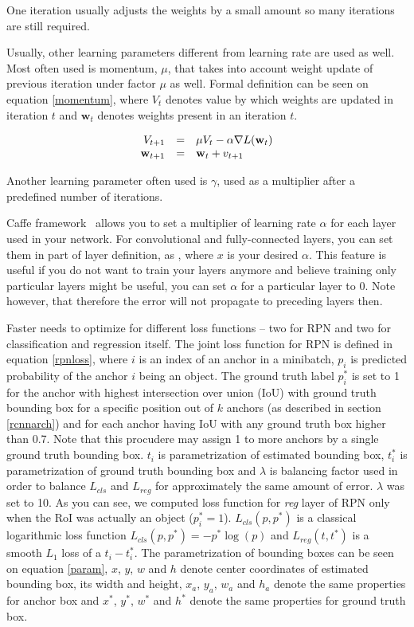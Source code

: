 One iteration usually adjusts the weights by a small amount so many iterations are still required.

Usually, other learning parameters different from learning rate are used as well. Most often used is momentum, $\mu$, that takes into account weight update of previous iteration under factor $\mu$ as well. Formal definition can be seen on equation \ref{momentum}, where $V_t$ denotes value by which weights are updated in iteration $t$ and $\textbf{w}_t$ denotes weights present in an iteration $t$.

\begin{equation}
\begin{array}{r c l}
V_{t+1}&=&\mu V_t - \alpha \nabla L(\textbf{w}_t)\\
\textbf{w}_{t+1}&=&\textbf{w}_t + v_{t+1}
\end{array}
\label{momentum}
\end{equation}

Another learning parameter often used is $\gamma$, used as a multiplier after a predefined number of iterations.

Caffe framework~\cite{caffe} allows you to set a multiplier of learning rate $\alpha$ for each layer used in your network. For convolutional and fully-connected layers, you can set them in  part of layer definition, as , where $x$ is your desired $\alpha$. This feature is useful if you do not want to train your layers anymore and believe training only particular layers might be useful, you can set $\alpha$ for a particular layer to 0. Note however, that therefore the error will not propagate to preceding layers then.

Faster \rcnn{} needs to optimize for different loss functions -- two for RPN and two for classification and regression itself. The joint loss function for RPN is defined in equation \ref{rpnloss}, where $i$ is an index of an anchor in a minibatch, $p_i$ is predicted probability of the anchor $i$ being an object. The ground truth label $p^*_i$ is set to 1 for the anchor with highest intersection over union (IoU) with ground truth bounding box for a specific position out of $k$ anchors (as described in section \ref{rcnnarch}) and for each anchor having IoU with any ground truth box higher than 0.7. Note that this procudere may assign 1 to more anchors by a single ground truth bounding box. $t_i$ is parametrization of estimated bounding box, $t_i^*$ is parametrization of ground truth bounding box and $\lambda$ is balancing factor used in order to balance $L_{cls}$ and $L_{reg}$ for approximately the same amount of error. $\lambda$ was set to 10. As you can see, we computed loss function for \emph{reg} layer of RPN only when the RoI was actually an object ($p^*_i = 1$). $L_{cls}(p,p^*)$ is a classical logarithmic loss function $L_{cls}(p,p^*) = -p^*\log(p)$ and $L_{reg}(t,t^*)$ is a smooth $L_1$ loss of a $t_i - t_i^*$. The parametrization of bounding boxes can be seen on equation \ref{param}, $x$, $y$, $w$ and $h$ denote center coordinates of estimated bounding box, its width and height, $x_a$, $y_a$, $w_a$ and $h_a$ denote the same properties for anchor box and $x^*$, $y^*$, $w^*$ and $h^*$ denote the same properties for ground truth box.

